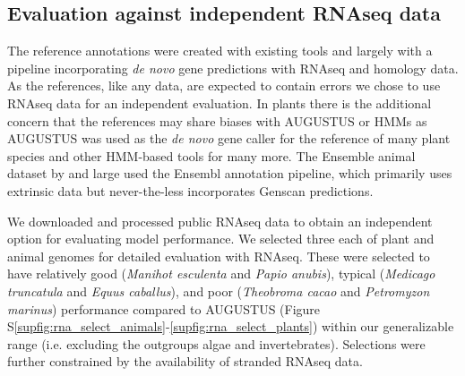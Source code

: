 \documentclass{bioinfo}
\newcounter{supfig}
\begin{document}
\begin{methods}
\subsection{Evaluation against independent RNAseq data}
\label{sec:rnaseq}
The reference annotations were created with existing tools and largely with a pipeline incorporating
{\it de novo} gene predictions with RNAseq and homology data. As the references, like any
data, are expected to contain errors we chose to use RNAseq data for an independent evaluation.
In plants there is the additional concern that the references may share biases with
AUGUSTUS or HMMs as AUGUSTUS was used as the {\it de novo} gene caller for the reference of
many plant species %
and other HMM-based tools for many more. %
The Ensemble animal dataset by and large used the Ensembl annotation pipeline, which primarily
uses extrinsic data but never-the-less incorporates Genscan \citep{burge1997prediction} predictions.

We downloaded and processed public RNAseq data to obtain an independent option 
for evaluating model performance. We selected three each of plant and animal genomes for
detailed evaluation with RNAseq. These were selected to have relatively good 
({\it Manihot esculenta} and {\it Papio anubis}), 
typical ({\it Medicago truncatula} and {\it Equus caballus}), 
and poor ({\it Theobroma cacao} and {\it Petromyzon marinus})
performance compared to AUGUSTUS (Figure S\ref{supfig:rna_select_animals}-\ref{supfig:rna_select_plants}) %
within our generalizable range (i.e. excluding the outgroups algae and
invertebrates). Selections were further constrained by the availability of stranded RNAseq
data. 


\end{methods}
\end{document}
